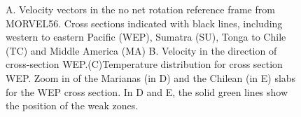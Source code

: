 \documentclass[12pt]{article}
\begin{document}
{\begin{figure}[hbtp]
\centering
{}

\label{fig:caption}
\end{figure}

\begin{figure}[hbtp]
\centering

\caption{A. Velocity vectors in the no net rotation reference frame from MORVEL56\citep{GGGE2060}. Cross sections indicated with black lines, including western to eastern Pacific (WEP), Sumatra (SU), Tonga to Chile (TC) and Middle America (MA) B. Velocity in the direction of cross-section WEP.(C)Temperature distribution for cross section WEP. Zoom in of the Marianas (in D) and the Chilean (in E) slabs for the WEP cross section. In D and E, the solid green lines show the position of the weak zones.}
\label{fig:xsection2sumatra}
\end{figure}



}
\end{document}
